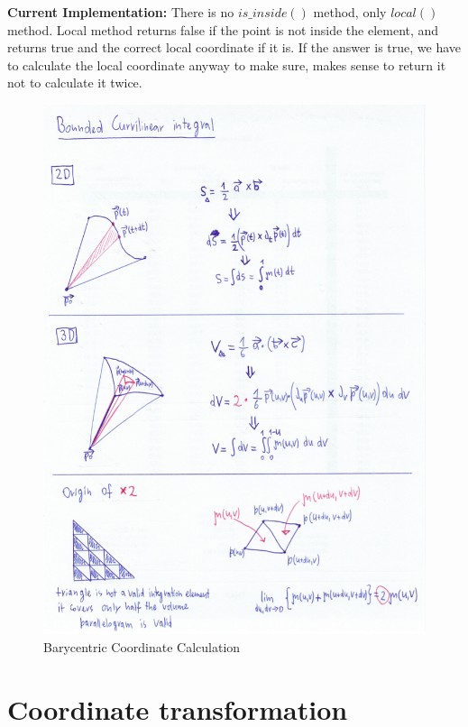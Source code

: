 \documentclass[12pt]{article}
\begin{document}
\noindent
\textbf{Current Implementation: } There is no $is\_inside()$ method, only $local()$ method. Local method returns false if the point is not inside the element, and returns true and the correct local coordinate if it is. If the answer is true, we have to calculate the local coordinate anyway to make sure, makes sense to return it not to calculate it twice.

\begin{figure}[p]
    \centering
    \includegraphics[scale=0.7]{doc-pics/pic-bounded-curvilinear-integral.png}
    \caption{Barycentric Coordinate Calculation}
    \label{fig:barycentric_coordinate_calculation}
\end{figure}


\section{Coordinate transformation}
\end{document}
